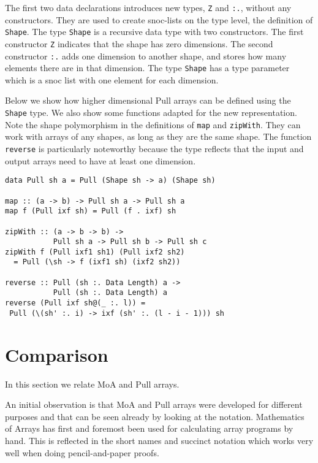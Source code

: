 \documentclass[preprint]{sigplanconf}
\begin{document}
The first two data declarations introduces new types, \verb!Z! and
\verb!:.!, without any constructors. They are used to create
snoc-lists on the type level, the definition of \verb!Shape!.  The
type \verb!Shape! is a recursive data type with two constructors. The
first constructor \verb!Z! indicates that the shape has zero
dimensions.  The second constructor \verb!:.! adds one dimension to
another shape, and stores how many elements there are in that
dimension. The type \verb!Shape! has a type parameter which is a snoc
list with one element for each dimension.

Below we show how higher dimensional Pull arrays can be defined using
the \verb!Shape! type. We also show some functions adapted for the new
representation. Note the shape polymorphism in the definitions of
\verb!map! and \verb!zipWith!. They can work with arrays of any
shapes, as long as they are the same shape.  The function
\verb!reverse! is particularly noteworthy because the type reflects
that the input and output arrays need to have at least one dimension.

\begin{small}
\begin{Verbatim}
data Pull sh a = Pull (Shape sh -> a) (Shape sh)

map :: (a -> b) -> Pull sh a -> Pull sh a
map f (Pull ixf sh) = Pull (f . ixf) sh

zipWith :: (a -> b -> b) -> 
           Pull sh a -> Pull sh b -> Pull sh c
zipWith f (Pull ixf1 sh1) (Pull ixf2 sh2)
  = Pull (\sh -> f (ixf1 sh) (ixf2 sh2))

reverse :: Pull (sh :. Data Length) a ->
           Pull (sh :. Data Length) a
reverse (Pull ixf sh@(_ :. l)) =
 Pull (\(sh' :. i) -> ixf (sh' :. (l - i - 1))) sh
\end{Verbatim}
\end{small}


\section{Comparison}

In this section we relate MoA and Pull arrays. 

An initial observation is that MoA and Pull arrays were developed for
different purposes and that can be seen already by looking at the
notation. Mathematics of Arrays has first and foremost been used for
calculating array programs by hand. This is reflected in the short
names and succinct notation which works very well when doing
pencil-and-paper proofs.
\end{document}
